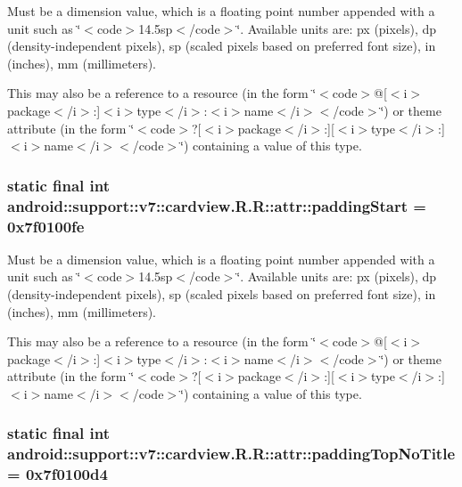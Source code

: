 Must be a dimension value, which is a floating point number appended with a unit such as \char`\"{}$<$code$>$14.5sp$<$/code$>$\char`\"{}. Available units are: px (pixels), dp (density-independent pixels), sp (scaled pixels based on preferred font size), in (inches), mm (millimeters). 

This may also be a reference to a resource (in the form \char`\"{}$<$code$>$@\mbox{[}$<$i$>$package$<$/i$>$:\mbox{]}$<$i$>$type$<$/i$>$:$<$i$>$name$<$/i$>$$<$/code$>$\char`\"{}) or theme attribute (in the form \char`\"{}$<$code$>$?\mbox{[}$<$i$>$package$<$/i$>$:\mbox{]}\mbox{[}$<$i$>$type$<$/i$>$:\mbox{]}$<$i$>$name$<$/i$>$$<$/code$>$\char`\"{}) containing a value of this type. \hypertarget{classandroid_1_1support_1_1v7_1_1cardview_1_1_r_1_1attr_7b42a5f2187b5e70cf49f7aa87d465a1}{
\subsubsection[{paddingStart}]{\setlength{\rightskip}{0pt plus 5cm}static final int android::support::v7::cardview.R.R::attr::paddingStart = 0x7f0100fe}}
\label{classandroid_1_1support_1_1v7_1_1cardview_1_1_r_1_1attr_7b42a5f2187b5e70cf49f7aa87d465a1}


Must be a dimension value, which is a floating point number appended with a unit such as \char`\"{}$<$code$>$14.5sp$<$/code$>$\char`\"{}. Available units are: px (pixels), dp (density-independent pixels), sp (scaled pixels based on preferred font size), in (inches), mm (millimeters). 

This may also be a reference to a resource (in the form \char`\"{}$<$code$>$@\mbox{[}$<$i$>$package$<$/i$>$:\mbox{]}$<$i$>$type$<$/i$>$:$<$i$>$name$<$/i$>$$<$/code$>$\char`\"{}) or theme attribute (in the form \char`\"{}$<$code$>$?\mbox{[}$<$i$>$package$<$/i$>$:\mbox{]}\mbox{[}$<$i$>$type$<$/i$>$:\mbox{]}$<$i$>$name$<$/i$>$$<$/code$>$\char`\"{}) containing a value of this type. \hypertarget{classandroid_1_1support_1_1v7_1_1cardview_1_1_r_1_1attr_9cdeb54ffc1091cf2e91b8d47ffc9134}{
\subsubsection[{paddingTopNoTitle}]{\setlength{\rightskip}{0pt plus 5cm}static final int android::support::v7::cardview.R.R::attr::paddingTopNoTitle = 0x7f0100d4}}
\label{classandroid_1_1support_1_1v7_1_1cardview_1_1_r_1_1attr_9cdeb54ffc1091cf2e91b8d47ffc9134}


